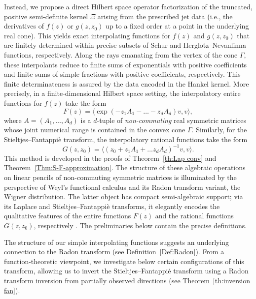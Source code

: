 \documentclass[11pt,reqno]{amsart}
\theoremstyle{plain}
\theoremstyle{definition}
\numberwithin{equation}{section}
\begin{document}
Instead, we propose a direct Hilbert space operator factorization of the truncated, positive semi-definite kernel $\Xi$ arising from the prescribed jet data (i.e., the derivatives of $f(z)$ or $g(z, z_0)$ up to a fixed order at a point in the underlying real cone). This yields exact interpolating functions for $f(z)$ and $g(z, z_0)$ that are finitely determined within precise subsets of Schur and Herglotz–Nevanlinna functions, respectively. Along the rays emanating from the vertex of the cone $\Gamma$, these interpolants reduce to finite sums of exponentials with positive coefficients and finite sums of simple fractions with positive coefficients, respectively. This finite determinateness is assured by the data encoded in the Hankel kernel. 
More precisely, in a finite-dimensional Hilbert space setting, the interpolatory entire functions for $f(z)$ take the form
$$ F(z) = \langle \exp (- z_1 A_1 - \ldots - z_d A_d) v, v \rangle,$$
where $A = (A_1, \dots, A_d)$ is a $d$-tuple of \textit{non-commuting} real symmetric matrices whose joint numerical range is contained in the convex cone $\Gamma$. Similarly, for the Stieltjes–Fantappi\`e transform, the interpolatory rational functions take the form
$$ G(z, z_0) = \langle (z_0 + z_1 A_1 + \ldots z_d A_d)^{-1} v, v \rangle.$$
This method is developed in the proofs of Theorem~\ref{th:Lap conv} and Theorem~\ref{Thm:S-F-approximation}. The structure of these algebraic operations on linear pencils of non-commuting symmetric matrices is illuminated by the perspective of Weyl's functional calculus \cite{Anderson} and its Radon transform variant, the Wigner distribution. The latter object has compact semi-algebraic support; via its Laplace and Stieltjes–Fantappi\`e transforms, it elegantly encodes the qualitative features of the entire functions $F(z)$ and the rational functions $G(z, z_0)$, respectively \cite{Cohen, SW}. The preliminaries below contain the precise definitions.


The structure of our simple interpolating functions suggests an underlying connection to the Radon transform (see Definition~\ref{Def:Radon}). From a function-theoretic viewpoint, we investigate below certain configurations of this transform, allowing us to invert the Stieltjes–Fantappié transform using a Radon transform inversion from partially observed directions (see Theorem~\ref{th:inversion fan}). 
\end{document}
